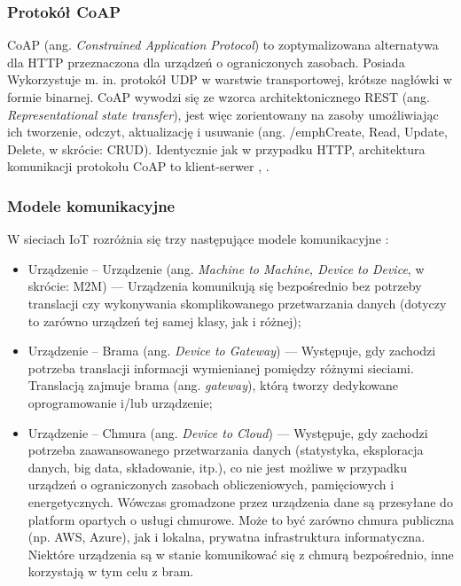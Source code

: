 \documentclass[a4paper, 12pt, twoside]{article}
\begin{document}
\subsubsection*{Protokół CoAP}

CoAP (ang. \emph{Constrained Application Protocol}) to zoptymalizowana alternatywa dla HTTP
przeznaczona dla urządzeń o ograniczonych zasobach. Posiada Wykorzystuje m. in. protokół
UDP w warstwie transportowej, krótsze nagłówki w formie binarnej. 
CoAP wywodzi się ze wzorca architektonicznego REST (ang. \emph{Representational state transfer}), 
jest więc zorientowany na zasoby umożliwiając ich tworzenie, odczyt, aktualizację
i usuwanie (ang. /emph{Create, Read, Update, Delete}, w skrócie: CRUD). 
Identycznie jak w przypadku HTTP, architektura komunikacji protokołu CoAP to klient-serwer 
\cite{intro-to-iot}, \cite{iot-hype-to-reality}.

\subsubsection*{Modele komunikacyjne}

W sieciach IoT rozróżnia się trzy następujące modele komunikacyjne \cite{intro-to-iot}:

\begin{itemize}
    \item Urządzenie -- Urządzenie (ang. \emph{Machine to Machine, Device to Device}, w skrócie: M2M)
    --- Urządzenia komunikują się bezpośrednio bez potrzeby translacji czy wykonywania 
    skomplikowanego przetwarzania danych (dotyczy to zarówno urządzeń tej samej klasy, jak i różnej);
    \item Urządzenie -- Brama (ang. \emph{Device to Gateway})
    --- Występuje, gdy zachodzi potrzeba translacji informacji wymienianej pomiędzy różnymi sieciami.
    Translacją zajmuje brama (ang. \emph{gateway}), którą tworzy dedykowane oprogramowanie i/lub urządzenie;
    \item Urządzenie -- Chmura (ang. \emph{Device to Cloud})
    --- Występuje, gdy zachodzi potrzeba zaawansowanego przetwarzania danych 
    (statystyka, eksploracja danych, big data, składowanie, itp.), 
    co nie jest możliwe w przypadku urządzeń o ograniczonych zasobach obliczeniowych, 
    pamięciowych i energetycznych. Wówczas gromadzone przez urządzenia dane są 
    przesyłane do platform opartych o usługi chmurowe. Może to być zarówno chmura publiczna 
    (np. AWS, Azure), jak i lokalna, prywatna infrastruktura informatyczna. 
    Niektóre urządzenia są w stanie komunikować się z chmurą bezpośrednio, inne
    korzystają w tym celu z bram.
\end{itemize}
\end{document}
